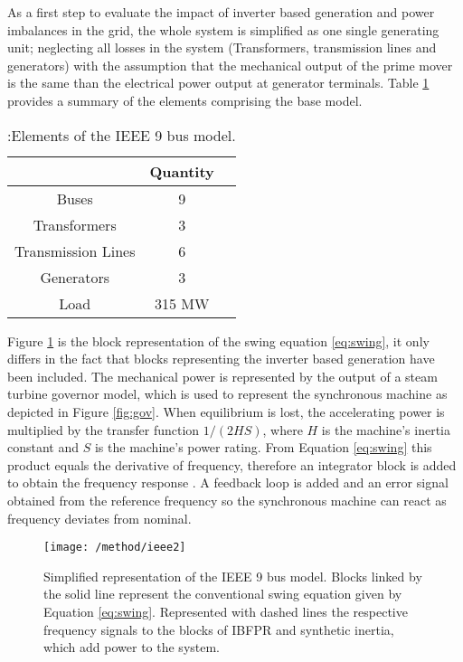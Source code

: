 As a first step to evaluate the impact of inverter based generation and power imbalances in the grid, the whole system is simplified as one single generating unit; neglecting all losses in the system (Transformers, transmission lines and generators) with the assumption that the mechanical output of the prime mover is the same than the electrical power output at generator terminals. Table \ref{tb:gridelements} provides a summary of the elements comprising the base model.\\




\begin{table}[h]
	\caption{\label{tb:gridelements}:Elements of the IEEE 9 bus model.}
	\centering
	\begin{tabular}{ccc}
		\toprule
		\textbf{}	& \textbf{Quantity}\\
		\midrule
		Buses		& 9			\\
		Transformers		& 3			\\
 		Transmission Lines			& 6 \\
		Generators			& 3 \\
 		Load			&  315 MW  \\
		\bottomrule
	\end{tabular}
\end{table}





Figure \ref{fig:ieeesimple} is the block representation of the swing equation \eqref{eq:swing}, it only differs in the fact that blocks representing the inverter based generation have been included. The mechanical power is represented by the output of a steam turbine governor model, which is used to represent the synchronous machine as depicted in Figure \ref{fig:gov}. When equilibrium is lost, the accelerating power is multiplied by the transfer function $ 1/(2HS) $, where $ H $ is the machine’s inertia constant and $ S $ is the machine’s power rating. From Equation \eqref{eq:swing} this product equals the derivative of frequency, therefore an integrator block is added to obtain the frequency response \cite{kundur1994power, john1994power, ogata1999ingenieria}. A feedback loop is added and an error signal obtained from the reference frequency so the synchronous machine can react as frequency deviates from nominal.

\begin{figure}[h]
	\centering
	\texttt{[image: /method/ieee2]}
	\caption{Simplified representation of the IEEE 9 bus model. Blocks linked by the solid line represent the conventional swing equation given by Equation \eqref{eq:swing}. Represented with dashed lines the respective frequency signals to the blocks of IBFPR and synthetic inertia, which add power to the system.}
	\label{fig:ieeesimple}
\end{figure}


